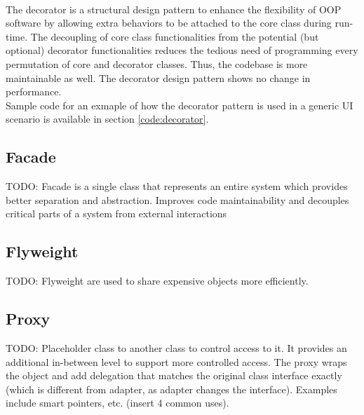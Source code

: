 \begin{multicols}{2}
\\
The decorator is a structural design pattern to enhance the flexibility of OOP software by allowing extra behaviors to be attached to the core class during run-time. The decoupling of core class functionalities from the potential (but optional) decorator functionalities reduces the tedious need of programming every permutation of core and decorator classes. Thus, the codebase is more maintainable as well. The decorator design pattern shows no change in performance.\bs
\\
Sample code for an exmaple of how the decorator pattern is used in a generic UI scenario is available in section \ref{code:decorator}.

\subsection{Facade}
TODO: Facade is a single class that represents an entire system which provides better separation and abstraction. Improves code maintainability and decouples critical parts of a system from external interactions

\subsection{Flyweight}
TODO: Flyweight are used to share expensive objects more efficiently. 

\subsection{Proxy}
TODO: Placeholder class to another class to control access to it. It provides an additional in-between level to support more controlled access. The proxy wraps the object and add delegation that matches the original class interface exactly (which is different from adapter, as adapter changes the interface). Examples include smart pointers, etc. (insert 4 common uses).


\iftwocolumns
\end{multicols}
\fi